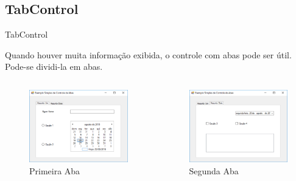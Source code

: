 \subsection{TabControl}

\begin{frame}

\begin{CaixaModelo01}{TabControl}
	
	Quando houver muita informação exibida, o controle com abas pode ser útil.
	Pode-se dividi-la em abas.

	\begin{columns}
		\begin{column}{0.48\textwidth}
			\begin{figure}
				\includegraphics[scale=.35]{./Figuras/F06_Tab01.png}
				\caption{Primeira Aba}
				\label{fig:TabControl01}
			\end{figure}
		\end{column}
		\begin{column}{0.48\textwidth}
			\begin{figure}
				\includegraphics[scale=.35]{./Figuras/F06_Tab02.png}
				\caption{Segunda Aba}
				\label{fig:TabControl02}
			\end{figure}
		\end{column}
	\end{columns}
\end{CaixaModelo01}
\end{frame}
